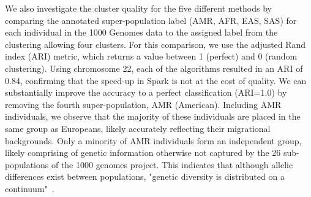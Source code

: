 \documentclass{bmcart}
\newcommand{\variantSpark}{{\sc VariantSpark}}
\newcommand{\kMeans}{\textit{k}-means}
\newcommand{\ARI}{adjusted Rand index}
\begin{document}

We also investigate the cluster quality for the five different methods by comparing the annotated super-population label (AMR, AFR, EAS, SAS) for each individual in the 1000 Genomes data to the assigned label from the clustering allowing four clusters. 
For this comparison, we use the \ARI{} (ARI) metric, which returns a value between 1 (perfect) and 0 (random clustering). 
Using chromosome 22, each of the algorithms resulted in an ARI of 0.84, confirming that the speed-up in {\sc Spark} is not at the cost of quality.
We can substantially improve the accuracy to a perfect classification (ARI=1.0) by removing the fourth super-population, AMR (American). 
Including AMR individuals, we observe that the majority of these individuals are placed in the same group as Europeans, likely accurately reflecting their migrational backgrounds. 
Only a minority of AMR individuals form an independent group, likely comprising of genetic information otherwise not captured by the 26 sub-populations of the 1000 genomes project.
This indicates that although allelic differences exist between populations, "genetic diversity is distributed on a continuum"~\cite{Hunter2014}.
\end{document}
